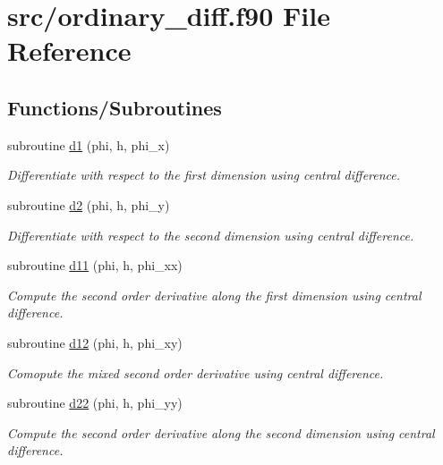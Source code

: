 \hypertarget{ordinary__diff_8f90}{}\section{src/ordinary\+\_\+diff.f90 File Reference}
\label{ordinary__diff_8f90}
\subsection*{Functions/\+Subroutines}
\begin{DoxyCompactItemize}
\item 
subroutine \hyperlink{ordinary__diff_8f90_aa47191c9295637e40dbba50694177b10}{d1} (phi, h, phi\+\_\+x)
\begin{DoxyCompactList}\small\item\em Differentiate with respect to the first dimension using central difference. \end{DoxyCompactList}\item 
subroutine \hyperlink{ordinary__diff_8f90_a2e0fe5c94e72d06e676e40fae5fb2cd8}{d2} (phi, h, phi\+\_\+y)
\begin{DoxyCompactList}\small\item\em Differentiate with respect to the second dimension using central difference. \end{DoxyCompactList}\item 
subroutine \hyperlink{ordinary__diff_8f90_ac5f9f809d18de96aed28e616a00f72c5}{d11} (phi, h, phi\+\_\+xx)
\begin{DoxyCompactList}\small\item\em Compute the second order derivative along the first dimension using central difference. \end{DoxyCompactList}\item 
subroutine \hyperlink{ordinary__diff_8f90_a2a1cc40e8717e8628176a3711ca5dc56}{d12} (phi, h, phi\+\_\+xy)
\begin{DoxyCompactList}\small\item\em Comopute the mixed second order derivative using central difference. \end{DoxyCompactList}\item 
subroutine \hyperlink{ordinary__diff_8f90_a2797f5c21dca13e9392d662ea45e648f}{d22} (phi, h, phi\+\_\+yy)
\begin{DoxyCompactList}\small\item\em Compute the second order derivative along the second dimension using central difference. \end{DoxyCompactList}\end{DoxyCompactItemize}



